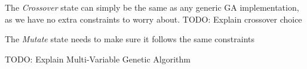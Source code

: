 \documentclass[12pt]{article}
\begin{document}
    The \textit{Crossover} state can simply be the same as any generic GA implementation,
    as we have no extra constraints to worry about. TODO: Explain crossover choice

    The \textit{Mutate} state needs to make sure it follows the same constraints

    TODO: Explain Multi-Variable Genetic Algorithm

\pagebreak


\end{document}
